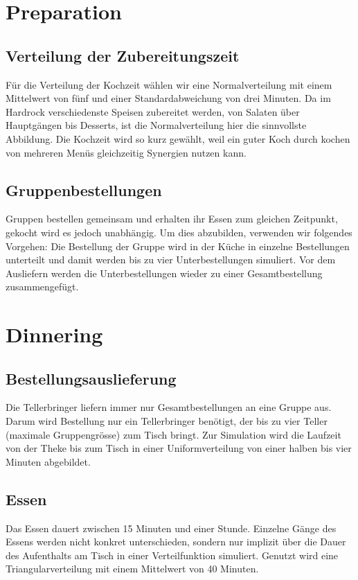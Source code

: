 \documentclass[ngerman,a4paper,12pt]{scrreprt}
\begin{document}
	
	\section{Preparation}	
		\subsection{Verteilung der Zubereitungszeit}
			Für die Verteilung der Kochzeit wählen wir eine Normalverteilung mit einem Mittelwert von fünf und einer Standardabweichung von drei Minuten. Da im Hardrock verschiedenste Speisen zubereitet werden, von Salaten über Hauptgängen bis Desserts, ist die Normalverteilung hier die sinnvollste Abbildung. Die Kochzeit wird so kurz gewählt, weil ein guter Koch durch kochen von mehreren Menüs gleichzeitig Synergien nutzen kann.
	
	
		\subsection{Gruppenbestellungen}
			Gruppen bestellen gemeinsam und erhalten ihr Essen zum gleichen Zeitpunkt, gekocht wird es jedoch unabhängig. Um dies abzubilden, verwenden wir folgendes Vorgehen: Die Bestellung der Gruppe wird in der Küche in einzelne Bestellungen unterteilt und damit werden bis zu vier Unterbestellungen simuliert. Vor dem Ausliefern werden die Unterbestellungen wieder zu einer Gesamtbestellung zusammengefügt.
			
			
	\section{Dinnering}
		\subsection{Bestellungsauslieferung}					
			Die Tellerbringer liefern immer nur Gesamtbestellungen an eine Gruppe aus. Darum wird Bestellung nur ein Tellerbringer benötigt, der bis zu vier Teller (maximale Gruppengrösse) zum Tisch bringt. Zur Simulation wird die Laufzeit von der Theke bis zum Tisch in einer Uniformverteilung von einer halben bis vier Minuten abgebildet.


		\subsection{Essen}
			Das Essen dauert zwischen 15 Minuten und einer Stunde. Einzelne Gänge des Essens werden nicht konkret unterschieden, sondern nur implizit über die Dauer des Aufenthalts am Tisch in einer Verteilfunktion simuliert. Genutzt wird eine Triangularverteilung mit einem Mittelwert von 40 Minuten.\\
			
\end{document}
